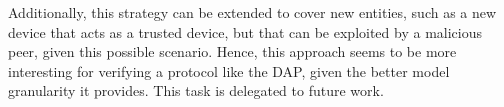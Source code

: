Additionally, this strategy can be extended to cover new entities, such as a new device that acts as a trusted device, but that can be exploited by a malicious peer, given this possible scenario. Hence, this approach seems to be more interesting for verifying a protocol like the DAP, given the better model granularity it provides. This task is delegated to future work.
